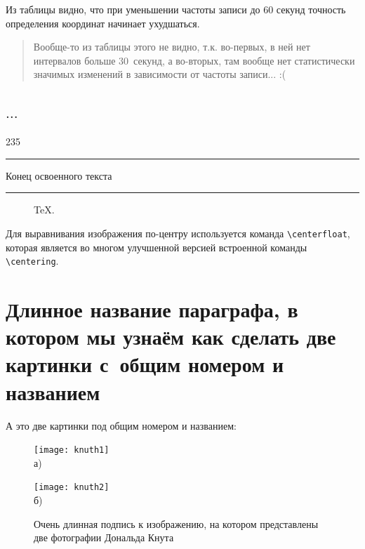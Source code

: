 Из таблицы видно, что при уменьшении частоты записи до 60 секунд точность определения координат начинает ухудшаться.

\begin{quote}
	Вообще-то из таблицы этого не видно, т.к. во-первых, в ней нет интервалов больше $30$~секунд, а во-вторых, там вообще нет статистически значимых изменений в зависимости от частоты записи... :(
\end{quote}


\subsection{$\ldots$}\label{subsec:ch2/sec3/sub5}

235


















\vfill
\noindent\rule{\textwidth}{.1pt}
\begin{center}				Конец освоенного текста					\end{center}
\noindent\rule{\textwidth}{1pt}
\newpage
\newpage



\begin{figure}[ht]
    \caption{TeX.}\label{fig:latex}
\end{figure}

Для выравнивания изображения по-центру используется команда \verb+\centerfloat+, которая является во
многом улучшенной версией встроенной команды \verb+\centering+.  

\section{Длинное название параграфа, в котором мы узнаём как сделать две картинки с~общим номером и названием}\label{sec:ch2/sect2}

А это две картинки под общим номером и названием:
\begin{figure}[ht]
    \begin{minipage}[b][][b]{0.49\linewidth}\centering
        \texttt{[image: knuth1]} \\ а)
    \end{minipage}
    \hfill
    \begin{minipage}[b][][b]{0.49\linewidth}\centering
        \texttt{[image: knuth2]} \\ б)
    \end{minipage}
    \caption{Очень длинная подпись к изображению,
        на котором представлены две фотографии Дональда Кнута}
    \label{fig:knuth}
\end{figure}

